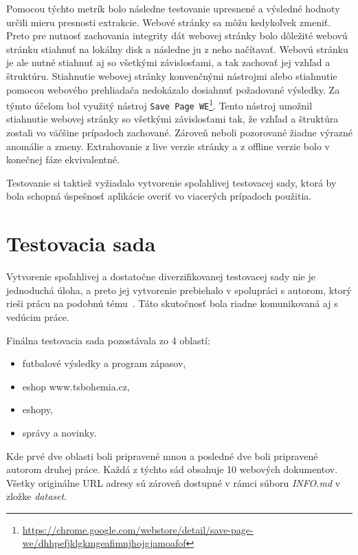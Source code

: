 Pomocou týchto metrík bolo následne testovanie upresnené a výsledné hodnoty určili mieru presnosti extrakcie. Webové stránky sa môžu kedykoľvek zmeniť. Preto pre nutnosť zachovania integrity dát webovej stránky bolo dôležité webovú stránku stiahnuť na lokálny disk a následne ju z neho načítavať. Webovú stránku je ale nutné stiahnuť aj so všetkými závislosťami, a tak zachovať jej vzhľad a štruktúru. Stiahnutie webovej stránky konvenčnými nástrojmi alebo stiahnutie pomocou webového prehliadača nedokázalo dosiahnuť požadované výsledky. Za týmto účelom bol využitý nástroj \texttt{Save Page WE}\footnote{\url{https://chrome.google.com/webstore/detail/save-page-we/dhhpefjklgkmgeafimnjhojgjamoafof}}. Tento nástroj umožnil stiahnutie webovej stránky so všetkými závislosťami tak, že vzhľad a štruktúra zostali vo väčšine prípadoch zachované. Zároveň neboli pozorované žiadne výrazné anomálie a zmeny. Extrahovanie z live verzie stránky a z offline verzie bolo v konečnej fáze ekvivalentné. 

Testovanie si taktiež vyžiadalo vytvorenie spoľahlivej testovacej sady, ktorá by bola schopná úspešnosť aplikácie overiť vo viacerých prípadoch použitia. 

\section{Testovacia sada}
\label{dataset}

Vytvorenie spoľahlivej a dostatočne diverzifikovanej testovacej sady nie je jednoduchá úloha, a preto jej vytvorenie prebiehalo v spolupráci s autorom, ktorý rieši prácu na podobnú tému~\cite{mastera}. Táto skutočnosť bola riadne komunikovaná aj s vedúcim práce.

Finálna testovacia sada pozostávala zo 4 oblastí:

\begin{itemize}
    \item futbalové výsledky a program zápasov,
    \item eshop www.tsbohemia.cz,
    \item eshopy,
    \item správy a novinky.
\end{itemize}

Kde prvé dve oblasti boli pripravené mnou a posledné dve boli pripravené autorom druhej práce. Každá z týchto sád obsahuje 10 webových dokumentov. Všetky originálne URL adresy sú zároveň dostupné v rámci súboru \textit{INFO.md} v zložke \textit{dataset}.

